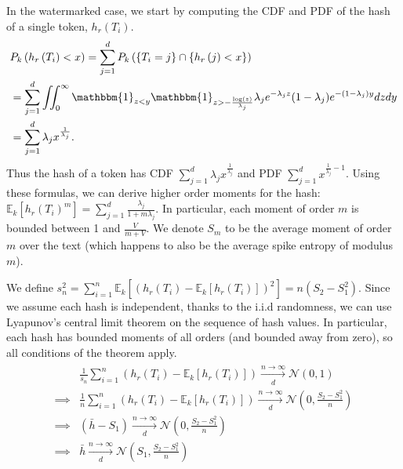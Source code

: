 In the watermarked case, we start by computing the CDF and PDF of the hash of a single token, 
$h_r\left(T_{i}\right)$.
\small
\begin{align}
    \begin{split}
        &P_k\left( h_r\left(T_{i}\right) < x \right) = \sum_{j=1}^d P_k\left( \{T_i = j\} \cap \{h_r\left(j\right) < x \}\right) \\
        &= \sum_{j=1}^d \iint_0^{\infty} \mathbbm{1}_{z < y} \mathbbm{1}_{z > -\frac{\log(z)}{\lambda_j}} \lambda_j e^{-\lambda_j z} (1-\lambda_j) e^{-(1-\lambda_j) y} dz dy\\
        &= \sum_{j=1}^d \lambda_j x^{\frac{1}{\lambda_j}}.
    \end{split}
\end{align}
\normalsize
Thus the hash of a token has CDF $\sum_{j=1}^d \lambda_j x^{\frac{1}{\lambda_j}}$ and PDF $\sum_{j=1}^d x^{\frac{1}{\lambda_j} - 1}$. Using these formulas, we can derive higher order moments for the hash: $\mathbb{E}_k\left[ h_r\left(T_i\right)^{m}\right] = \sum_{j=1}^{d} \frac{\lambda_j}{1 + m\lambda_j}$. In particular, each moment of order $m$ is bounded between 1 and $\frac{V}{m+V}$. We denote $S_m$ to be the average moment of order $m$ over the text (which happens to also be the average spike entropy of modulus $m$).

We define $s^2_n = \sum_{i=1}^{n} \mathbb{E}_k\left[ \left(h_r\left(T_i\right) - 
\mathbb{E}_k\left[h_r\left(T_i\right)\right]\right)^2 \right] = n\left(S_2 - S_1^2\right)$.
Since we assume each hash is independent, thanks to the i.i.d randomness, we 
can use Lyapunov's central limit theorem on the sequence of hash values. In particular, each 
hash has bounded moments of all orders (and bounded away from zero), so all conditions of 
the theorem apply.
\begin{align}
\begin{split}
    &\frac{1}{s_n} \sum_{i=1}^n \left( h_r\left(T_i\right) - \mathbb{E}_k\left[h_r\left(T_i\right)\right] \right) \xrightarrow[d]{n \rightarrow \infty} \mathcal{N}(0,1)\\
    \implies &\frac{1}{n} \sum_{i=1}^n \left( h_r\left(T_i\right) - \mathbb{E}_k\left[h_r\left(T_i\right)\right] \right) \xrightarrow[d]{n \rightarrow \infty} \mathcal{N}(0,\frac{S_2 - S_1^2}{n})\\
    \implies &\left(\bar{h} - S_1\right) \xrightarrow[d]{n \rightarrow \infty}  \mathcal{N}(0,\frac{S_2 - S_1^2}{n})\\
    \implies &\bar{h} \xrightarrow[d]{n \rightarrow \infty} \mathcal{N}(S_1,\frac{S_2 - S_1^2}{n})\\
\end{split}
\end{align}

